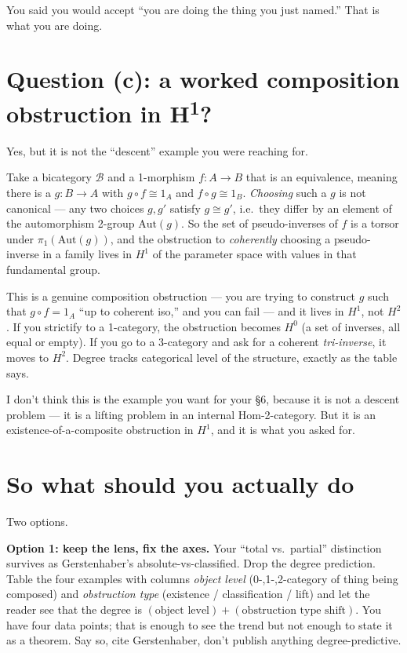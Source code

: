 \documentclass[11pt]{article}
\begin{document}
You said you would accept ``you are doing the thing you just named.''  That is what you are doing.

\section{Question (c): a worked composition obstruction in H\textsuperscript{1}?}

Yes, but it is not the ``descent'' example you were reaching for.

Take a bicategory $\mathcal{B}$ and a 1-morphism $f\colon A \to B$ that is an equivalence, meaning there is a $g\colon B \to A$ with $g\circ f \cong 1_{A}$ and $f\circ g \cong 1_{B}$.  \emph{Choosing} such a $g$ is not canonical --- any two choices $g, g'$ satisfy $g \cong g'$, i.e.\ they differ by an element of the automorphism 2-group $\mathrm{Aut}(g)$.  So the set of pseudo-inverses of $f$ is a torsor under $\pi_{1}(\mathrm{Aut}(g))$, and the obstruction to \emph{coherently} choosing a pseudo-inverse in a family lives in $H^{1}$ of the parameter space with values in that fundamental group.

This is a genuine composition obstruction --- you are trying to construct $g$ such that $g\circ f = 1_{A}$ ``up to coherent iso,'' and you can fail --- and it lives in $H^{1}$, not $H^{2}$.  If you strictify to a 1-category, the obstruction becomes $H^{0}$ (a set of inverses, all equal or empty).  If you go to a 3-category and ask for a coherent \emph{tri-inverse}, it moves to $H^{2}$.  Degree tracks categorical level of the structure, exactly as the table says.

I don't think this is the example you want for your \S6, because it is not a descent problem --- it is a lifting problem in an internal $\mathrm{Hom}$-2-category.  But it is an existence-of-a-composite obstruction in $H^{1}$, and it is what you asked for.

\section{So what should you actually do}

Two options.

\textbf{Option 1: keep the lens, fix the axes.}  Your ``total vs.\ partial'' distinction survives as Gerstenhaber's absolute-vs-classified.  Drop the degree prediction.  Table the four examples with columns \emph{object level} (0-,1-,2-category of thing being composed) and \emph{obstruction type} (existence / classification / lift) and let the reader see that the degree is $(\text{object level}) + (\text{obstruction type shift})$.  You have four data points; that is enough to see the trend but not enough to state it as a theorem.  Say so, cite Gerstenhaber, don't publish anything degree-predictive.
\end{document}
